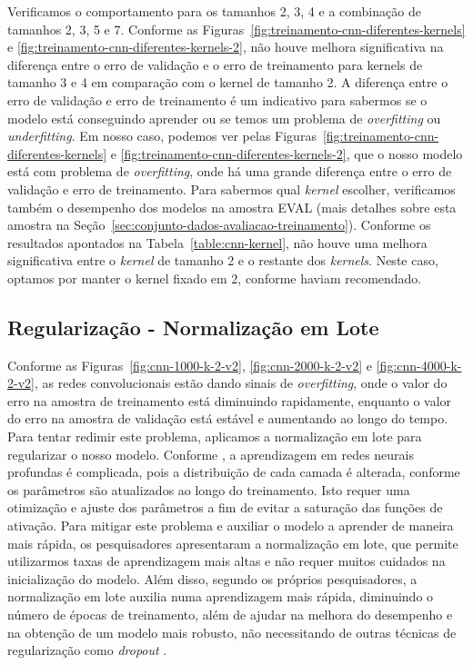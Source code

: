 Verificamos o comportamento para os tamanhos 2, 3, 4 e a combinação de tamanhos 2, 3, 5 e 7. Conforme as Figuras~\ref{fig:treinamento-cnn-diferentes-kernels} e \ref{fig:treinamento-cnn-diferentes-kernels-2}, não houve melhora significativa na diferença entre o erro de validação e o erro de treinamento para kernels de tamanho 3 e 4 em comparação com o kernel de tamanho 2. A diferença entre o erro de validação e erro de treinamento é um indicativo para sabermos se o modelo está conseguindo aprender ou se temos um problema de \textit{overfitting} ou \textit{underfitting}. Em nosso caso, podemos ver pelas Figuras~\ref{fig:treinamento-cnn-diferentes-kernels} e \ref{fig:treinamento-cnn-diferentes-kernels-2}, que o nosso modelo está com problema de \textit{overfitting}, onde há uma grande diferença entre o erro de validação e erro de treinamento. Para sabermos qual \textit{kernel} escolher, verificamos também o desempenho dos modelos na amostra EVAL (mais detalhes sobre esta amostra na Seção~\ref{sec:conjunto-dados-avaliacao-treinamento}). Conforme os resultados apontados na Tabela~\ref{table:cnn-kernel}, não houve uma melhora significativa entre o \textit{kernel} de tamanho 2 e o restante dos \textit{kernels}. Neste caso, optamos por manter o kernel fixado em $2$, conforme  haviam recomendado.


\subsection{Regularização - Normalização em Lote}
\label{sec:regularizacao-normalizacao-lote}

Conforme as Figuras~\ref{fig:cnn-1000-k-2-v2}, \ref{fig:cnn-2000-k-2-v2} e \ref{fig:cnn-4000-k-2-v2}, as redes convolucionais estão dando sinais de \textit{overfitting}, onde o valor do erro na amostra de treinamento está diminuindo rapidamente, enquanto o valor do erro na amostra de validação está estável e aumentando ao longo do tempo. Para tentar redimir este problema, aplicamos a normalização em lote para regularizar o nosso modelo. Conforme , a aprendizagem em redes neurais profundas é complicada, pois a distribuição de cada camada é alterada, conforme os parâmetros são atualizados ao longo do treinamento. Isto requer uma otimização e ajuste dos parâmetros a fim de evitar a saturação das funções de ativação. Para mitigar este problema e auxiliar o modelo a aprender de maneira mais rápida, os pesquisadores apresentaram a normalização em lote, que permite utilizarmos taxas de aprendizagem mais altas e não requer muitos cuidados na inicialização do modelo. Além disso, segundo os próprios pesquisadores, a normalização em lote auxilia numa aprendizagem mais rápida, diminuindo o número de épocas de treinamento, além de ajudar na melhora do desempenho e na obtenção de um modelo mais robusto, não necessitando de outras técnicas de regularização como \textit{dropout} \cite{sergey-batch-normalization-2015}.

